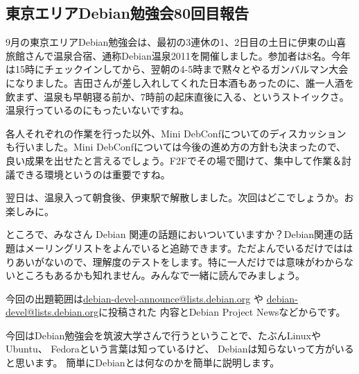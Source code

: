 \documentclass[mingoth,a4paper]{jsarticle}
\begin{document}
\subsection{東京エリアDebian勉強会80回目報告}

9月の東京エリアDebian勉強会は、最初の3連休の1、2日目の土日に伊東の山喜旅館さんで温泉合宿、通称Debian温泉2011を開催しました。参加者は8名。今年は15時にチェックインしてから、翌朝の4-5時まで黙々とやるガンバルマン大会になりました。吉田さんが差し入れしてくれた日本酒もあったのに、誰一人酒を飲まず、温泉も早朝寝る前か、7時前の起床直後に入る、というストイックさ。温泉行っているのにもったいないですね。

各人それぞれの作業を行った以外、Mini DebConfについてのディスカッションも行いました。Mini DebConfについては今後の進め方の方針も決まったので、良い成果を出せたと言えるでしょう。F2Fでその場で聞けて、集中して作業＆討議できる環境というのは重要ですね。

翌日は、温泉入って朝食後、伊東駅で解散しました。次回はどこでしょうか。お楽しみに。





ところで、みなさん Debian 関連の話題においついていますか？Debian関連の話
題はメーリングリストをよんでいると追跡できます。ただよんでいるだけではは
りあいがないので、理解度のテストをします。特に一人だけでは意味がわからな
いところもあるかも知れません。みんなで一緒に読んでみましょう。

今回の出題範囲は\url{debian-devel-announce@lists.debian.org} や \url{debian-devel@lists.debian.org}に投稿された
内容とDebian Project Newsなどからです。

\begin{multicols}{2}
 
\end{multicols}




今回はDebian勉強会を筑波大学さんで行うということで、たぶんLinuxやUbuntu、
Fedoraという言葉は知っているけど、
Debianは知らないって方がいると思います。
簡単にDebianとは何なのかを簡単に説明します。
\end{document}
